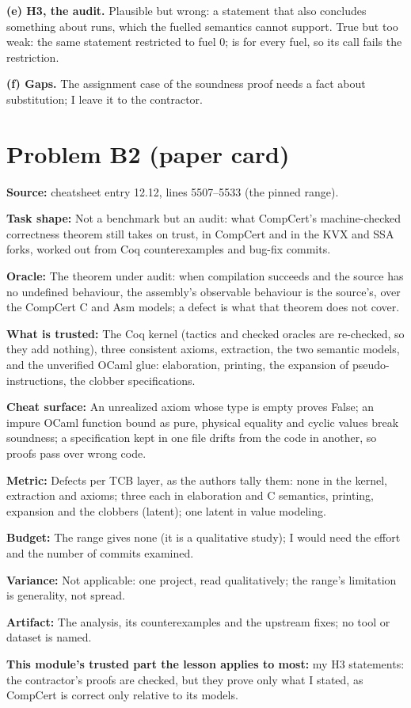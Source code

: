 \documentclass[11pt]{article}
\begin{document}
\begin{answer}
\textbf{(e) H3, the audit.} Plausible but wrong: a statement that also concludes
something about  runs, which the fuelled semantics cannot support.
True but too weak: the same statement restricted to fuel 0; 
is for every fuel, so its call fails the restriction.

\textbf{(f) Gaps.} The assignment case of the soundness proof needs a fact about
substitution; I leave it to the contractor.
\end{answer}

\section*{Problem B2 (paper card)}\label{ans:B2}
\begin{answer}
\textbf{Source:} cheatsheet entry 12.12, lines 5507--5533 (the pinned range).

\textbf{Task shape:} Not a benchmark but an audit: what CompCert's machine-checked
correctness theorem still takes on trust, in CompCert and in the KVX and SSA
forks, worked out from Coq counterexamples and bug-fix commits.

\textbf{Oracle:} The theorem under audit: when compilation succeeds and the source
has no undefined behaviour, the assembly's observable behaviour is the
source's, over the CompCert C and Asm models; a defect is what that theorem
does not cover.

\textbf{What is trusted:} The Coq kernel (tactics and checked oracles are re-checked,
so they add nothing), three consistent axioms, extraction, the two semantic
models, and the unverified OCaml glue: elaboration, printing, the expansion of
pseudo-instructions, the clobber specifications.

\textbf{Cheat surface:} An unrealized axiom whose type is empty proves False; an
impure OCaml function bound as pure, physical equality and cyclic values break
soundness; a specification kept in one file drifts from the code in another, so
proofs pass over wrong code.

\textbf{Metric:} Defects per TCB layer, as the authors tally them: none in the
kernel, extraction and axioms; three each in elaboration and C semantics,
printing, expansion and the clobbers (latent); one latent in value modeling.

\textbf{Budget:} The range gives none (it is a qualitative study); I would need the
effort and the number of commits examined.

\textbf{Variance:} Not applicable: one project, read qualitatively; the range's
limitation is generality, not spread.

\textbf{Artifact:} The analysis, its counterexamples and the upstream fixes; no tool
or dataset is named.

\textbf{This module's trusted part the lesson applies to most:} my H3 statements: the
contractor's proofs are checked, but they prove only what I stated, as CompCert
is correct only relative to its models.
\end{answer}
\end{document}
